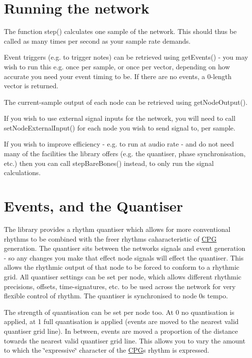 \section*{Running the network}

The function step() calculates one sample of the network. This should thus be called as many times per second as your sample rate demands.

Event triggers (e.\+g. to trigger notes) can be retrieved using get\+Events() -\/ you may wish to run this e.\+g. once per sample, or once per vector, depending on how accurate you need your event timing to be. If there are no events, a 0-\/length vector is returned.

The current-\/sample output of each node can be retrieved using get\+Node\+Output().

If you wish to use external signal inputs for the network, you will need to call set\+Node\+External\+Input() for each node you wish to send signal to, per sample.

If you wish to improve efficiency -\/ e.\+g. to run at audio rate -\/ and do not need many of the facilities the library offers (e.\+g. the quantiser, phase synchronisation, etc.) then you can call step\+Bare\+Bones() instead, to only run the signal calculations.

\section*{Events, and the Quantiser}

The library provides a rhythm quantiser which allows for more conventional rhythms to be combined with the freer rhythms caharacteristic of \hyperlink{classCPG}{C\+PG} generation. The quantiser sits between the network\textquotesingle{}s signals and event generation -\/ so any changes you make that effect node signals will effect the quantiser. This allows the rhythmic output of that node to be forced to conform to a rhythmic grid. All quantiser settings can be set per node, which allows different rhythmic precisions, offsets, time-\/signatures, etc. to be used across the network for very flexible control of rhythm. The quantiser is synchronised to node 0\textquotesingle{}s tempo.

The strength of quantisation can be set per node too. At 0 no quantisation is applied, at 1 full quantisation is applied (events are moved to the nearest valid quantiser grid line). In between, events are moved a proportion of the distance towards the nearest valid quantiser grid line. This allows you to vary the amount to which the \char`\"{}expressive\char`\"{} character of the \hyperlink{classCPG}{C\+PG}\textquotesingle{}s rhythm is expressed.

